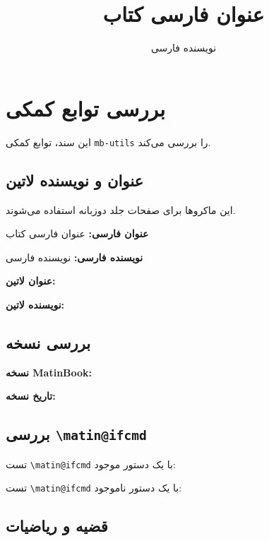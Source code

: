 \documentclass{matinbook}
\title{عنوان فارسی کتاب}
\author{نویسنده فارسی}
\begin{document}
\maketitle

\chapter{بررسی توابع کمکی}
\label{chap:test-utils}

این سند، توابع کمکی \texttt{mb-utils} را بررسی می‌کند.

\section{عنوان و نویسنده لاتین}
\label{sec:latin-title}

این ماکروها برای صفحات جلد دوزبانه استفاده می‌شوند.

\textbf{عنوان فارسی:} عنوان فارسی کتاب

\textbf{نویسنده فارسی:} نویسنده فارسی

\textbf{عنوان لاتین:} \makeatletter\@latintitle\makeatother

\textbf{نویسنده لاتین:} \makeatletter\@latinauthor\makeatother

\section{بررسی نسخه}
\label{sec:version}

\textbf{نسخه MatinBook:} \matinbookversion

\textbf{تاریخ نسخه:} \matinbookdate

\section{بررسی \texttt{\textbackslash matin@ifcmd}}
\label{sec:ifcmd}

تست \texttt{\textbackslash matin@ifcmd} با یک دستور موجود:

\makeatletter
{}
\makeatother

تست \texttt{\textbackslash matin@ifcmd} با یک دستور ناموجود:

\makeatletter
{}
\makeatother

\section{قضیه و ریاضیات}
\label{sec:theorem-math}
\end{document}
